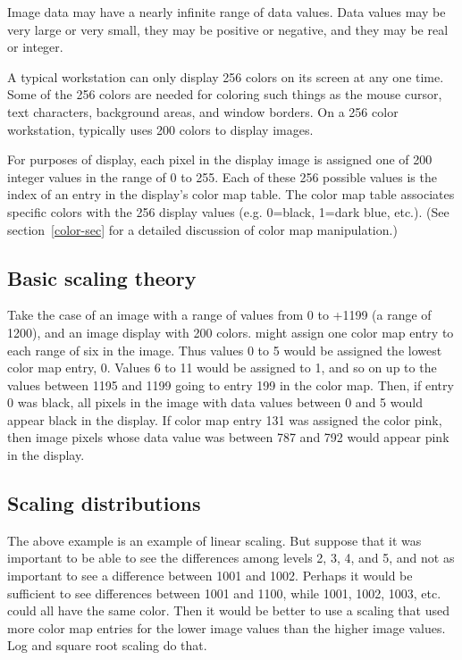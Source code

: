 Image data may have a nearly infinite range of data values.  Data
values may be very large or very small, they may be positive or
negative, and they may be real or integer.

A typical workstation can only display 256 colors on its screen at any
one time.  Some of the 256 colors are needed for coloring such things
as the mouse cursor, text characters, background areas, and window
borders.  On a 256 color workstation, {\SAO} typically uses
200 colors to display images.

For purposes of display, each pixel in the display image is assigned
one of 200 integer values in the range of 0 to 255.  Each of these
256 possible values is the index of an entry in the
display's color map table.  The color map table associates specific
colors with the 256 display values (e.g. 0=black, 1=dark blue, etc.).
(See section~\ref{color-sec} for a detailed discussion of color map
manipulation.)

\subsection{ Basic scaling theory }

Take the case of an image with a range of values from 0 to +1199 (a
range of 1200), and an image display with 200 colors.  {\SAO}
might assign one color map entry to each range of six in the
image.  Thus values 0 to 5 would be assigned the lowest color map
entry, 0.  Values 6 to 11 would be assigned to 1, and so on up to the values
between 1195 and 1199 going to entry 199 in the color map.  Then, if
entry 0 was black, all pixels in the image with data values between 0
and 5 would appear black in the display.  If color map entry 131 was
assigned the color pink, then image pixels whose data value was
between 787 and 792 would appear pink in the display.

\subsection{ Scaling distributions }

The above example is an example of linear scaling.  But suppose that it
was important to be able to see the differences among levels 2, 3, 4,
and 5, and not as important to see a difference between 1001 and 1002.
Perhaps it would be sufficient to see differences between 1001 and 1100,
while 1001, 1002, 1003, etc. could all have the same color.  Then it would
be better to use a scaling that used more color map entries for the lower
image values than the higher image values.  Log and square root scaling
do that.

